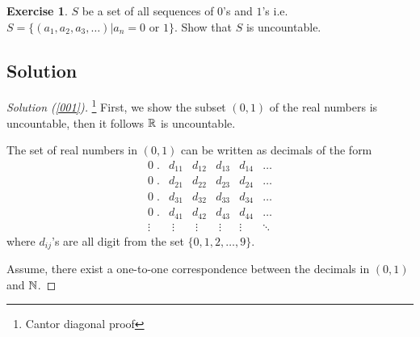 \documentclass[	DIV=calc,paper=a4,fontsize=11pt]{scrartcl}	 	%
\theoremstyle{definition}
\newtheorem{exer}[thm]{Exercise}
\theoremstyle{plain}
\theoremstyle{remark}
\begin{document}
\begin{exer}\label{004}
$S$ be a set of all sequences of $0$'s and $1$'s i.e. $S=\{(a_1,a_2,a_3,\ldots)|a_n=0\text{ or } 1\}$. Show that $S$ is uncountable.
\end{exer}

\newpage
\subsection*{Solution}
\begin{proof}[Solution (\ref{001})]\footnote{Cantor diagonal proof}
First, we show the subset $(0,1)$ of the real numbers is uncountable, then it follows $\Bbb R$ is uncountable.

  The set of real numbers in $(0,1)$ can be written as decimals of the form
  $$
  \begin{array}{rlllll}
  0\;.&d_{11}&d_{12}&d_{13}&d_{14}&\ldots\\
  0\;.&d_{21}&d_{22}&d_{23}&d_{24}&\ldots\\
  0\;.&d_{31}&d_{32}&d_{33}&d_{34}&\ldots\\
  0\;.&d_{41}&d_{42}&d_{43}&d_{44}&\ldots\\
  \vdots\; & \;\vdots&\;\vdots&\;\vdots\;&\vdots&\ddots
  \end{array}
  $$
  where $d_{ij}$'s are all digit from the set $\{0,1,2,\ldots,9\}$.

  Assume, there exist a one-to-one correspondence between the decimals in $(0,1)$ and $\Bbb N$.


\end{proof}
\end{document}
